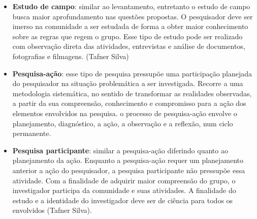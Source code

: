\begin{itemize}
\item \textbf{Estudo de campo}: similar ao levantamento, entretanto o estudo de campo busca maior aprofundamento nas questões propostas. O pesquisador deve ser imerso na comunidade a ser estudada de forma a obter maior conhecimento sobre as regras que regem o grupo. Esse tipo de estudo pode ser realizado com observação direta das atividades, entrevistas e análise de documentos, fotografias e filmagens. (Tafner Silva)

\item \textbf{Pesquisa-ação}: esse tipo de pesquisa pressupõe uma participação planejada do pesquisador na situação problemática a ser investigada. Recorre a uma metodologia sistemática, no sentido de transformar as realidades observadas, a partir da sua compreensão, conhecimento e compromisso para a ação dos elementos envolvidos na pesquisa. o processo de pesquisa-ação envolve o planejamento, diagnóstico, a ação, a observação e a reflexão, num ciclo permanente.

\item \textbf{Pesquisa participante}: similar a pesquisa-ação diferindo quanto ao planejamento da ação. Enquanto a pesquisa-ação requer um planejamento anterior a ação do pesquisador, a pesquisa participante não pressupõe essa atividade. Com a finalidade de adquirir maior compreensão do grupo, o investigador participa da comunidade e suas atividades. A finalidade do estudo e a identidade do investigador deve ser de ciência para todos os envolvidos (Tafner Silva).

\end{itemize}





